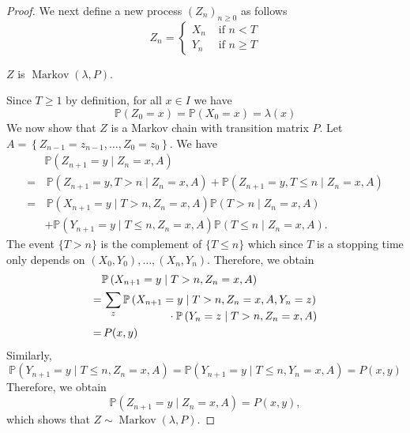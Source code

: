 \documentclass[a4paper]{article}
\begin{document}
\begin{proof}
    We next define a new process $\left(Z_n\right)_{n \geq 0}$ as follows
    \[
    Z_n= \begin{cases}X_n & \text { if } n<T \\ Y_n & \text { if } n \geq T\end{cases}
    \]
    \begin{claim}
        $Z$ is $\operatorname{Markov}(\lambda, P)$.
    \end{claim}
    Since $T \geq 1$ by definition, for all $x \in I$ we have
    \[
    \mathbb{P}\left(Z_0=x\right)=\mathbb{P}\left(X_0=x\right)=\lambda(x)
    \]
    We now show that $Z$ is a Markov chain with transition matrix $P$. Let $A=\left\{Z_{n-1}=z_{n-1}, \ldots, Z_0=z_0\right\}$. We have
    \[
    \begin{aligned}
    &\mathbb{P}\left(Z_{n+1}=y \mid Z_n=x, A\right)\\=&\, \mathbb{P}\left(Z_{n+1}=y, T>n \mid Z_n=x, A\right)+\mathbb{P}\left(Z_{n+1}=y, T \leq n \mid Z_n=x, A\right) \\
    =&\, \mathbb{P}\left(X_{n+1}=y \mid T>n, Z_n=x, A\right) \mathbb{P}\left(T>n \mid Z_n=x, A\right) \\
    &+\mathbb{P}\left(Y_{n+1}=y \mid T \leq n, Z_n=x, A\right) \mathbb{P}\left(T \leq n \mid Z_n=x, A\right) .
    \end{aligned}
    \]
    The event $\{T>n\}$ is the complement of $\{T \leq n\}$ which since $T$ is a stopping time only depends on $\left(X_0, Y_0\right), \ldots,\left(X_n, Y_n\right)$. Therefore, we obtain
    \begin{align*}
        & \mathbb{P}\left(X_{n+1}
        =y \mid T>n, Z_n=x, A\right)\\ 
    =&\, \sum_z \mathbb{P}\left(X_{n+1}=y \mid T>n, Z_n=x, A, Y_n=z\right) \\[-1em]
    &\hspace*{6em}\cdot \mathbb{P}\left(Y_n=z \mid T>n, Z_n=x, A\right)\\ 
    =&\, P(x, y)
    \end{align*}
    Similarly,
    \[
    \mathbb{P}\left(Y_{n+1}=y \mid T \leq n, Z_n=x, A\right)=\mathbb{P}\left(Y_{n+1}=y \mid T \leq n, Y_n=x, A\right)=P(x, y)
    \]
    Therefore, we obtain
    \[
    \mathbb{P}\left(Z_{n+1}=y \mid Z_n=x, A\right)=P(x, y),
    \]
    which shows that $Z \sim \operatorname{Markov}(\lambda, P)$.


\end{proof}
\end{document}
